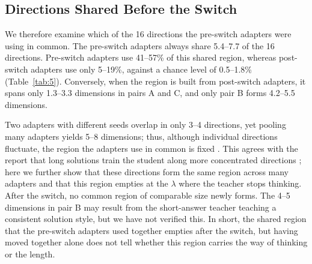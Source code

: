 \begin{table}[t]
\centering
\small

\caption{Teacher think rate and $R(\lambda)$ of the student adapters for each pair, side by side. $R$ measures how much an adapter uses the same directions as the $\lambda=0$ adapter, relative to a baseline that changes only the data; 1 means the directions are unchanged, and values near 0 mean the directions changed sharply. Each pair's $R$ drops most in the interval where its own teacher drops the tag. Values after $\pm$ are standard deviations across three seeds.}
\label{tab:3}
\end{table}

\begin{table}[t]
\centering
\small
\resizebox{\columnwidth}{!}{}
\caption{Correlation $r$ between the drop in teacher think rate and the drop in $R$ in each $\lambda$ interval, and the $p$ of the permutation test. With only five intervals, no single pair is significant, but pooling the three pairs gives $p = 0.0035$, showing that the adapter switch occurs in the same $\lambda$ interval as the teacher switch.}
\label{tab:4}
\end{table}

\subsection{Directions Shared Before the Switch}\label{sec:shared}

We therefore examine which of the 16 directions the pre-switch adapters were using in common.
The pre-switch adapters always share 5.4--7.7 of the 16 directions.
Pre-switch adapters use 41--57\% of this shared region, whereas post-switch adapters use only 5--19\%, against a chance level of 0.5--1.8\% (Table~\ref{tab:5}).
Conversely, when the region is built from post-switch adapters, it spans only 1.3--3.3 dimensions in pairs A and C, and only pair B forms 4.2--5.5 dimensions.

Two adapters with different seeds overlap in only 3--4 directions, yet pooling many adapters yields 5--8 dimensions; thus, although individual directions fluctuate, the region the adapters use in common is fixed \citep{gerasimov2026unstable}.
This agrees with the report that long solutions train the student along more concentrated directions \citep{lan2026midistillation}; here we further show that these directions form the same region across many adapters and that this region empties at the $\lambda$ where the teacher stops thinking.
After the switch, no common region of comparable size newly forms.
The 4--5 dimensions in pair B may result from the short-answer teacher teaching a consistent solution style, but we have not verified this.
In short, the shared region that the pre-switch adapters used together empties after the switch, but having moved together alone does not tell whether this region carries the way of thinking or the length.

